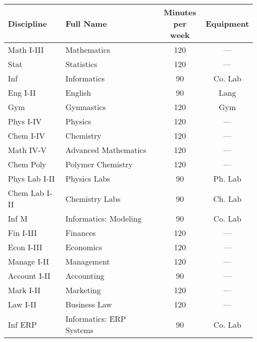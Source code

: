\begin{tabular}{llcc}
  Discipline & Full Name & \shortstack{Minutes\\per week} & Equipment \\\hline\hline
  Math I-III   & Mathematics            & 120 & --- \\
  Stat         & Statistics             & 120 & --- \\
  Inf          & Informatics            & 90  & Co. Lab \\
  Eng I-II     & English                & 90  & Lang \\
  Gym          & Gymnastics             & 120 & Gym \\\hline
  Phys I-IV    & Physics                & 120 & --- \\
  Chem I-IV    & Chemistry              & 120 & --- \\
  Math IV-V    & Advanced Mathematics   & 120 & --- \\
  Chem Poly    & Polymer Chemistry      & 120 & --- \\
  Phys Lab I-II & Physics Labs         & 90  & Ph. Lab \\
  Chem Lab I-II & Chemistry Labs       & 90  & Ch. Lab \\
  Inf M        & Informatics: Modeling  & 90  & Co. Lab \\\hline
  Fin I-III    & Finances               & 120 & --- \\
  Econ I-III   & Economics              & 120 & --- \\
  Manage I-II  & Management             & 120 & --- \\
  Account I-II & Accounting             & 90  & --- \\
  Mark I-II    & Marketing              & 120 & --- \\
  Law I-II     & Business Law           & 120 & --- \\
  Inf ERP      & Informatics: ERP Systems & 90 & Co. Lab \\\hline
\end{tabular}
